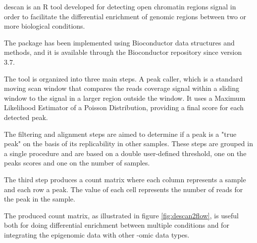 \gls{descan} is an R \cite{Ihaka1996} tool developed for detecting open chromatin regions signal in order to facilitate the differential enrichment of genomic regions between two or more biological conditions.

The package has been implemented using Bioconductor \cite{Gentleman2004} data structures and methods, and it is available through the Bioconductor repository since version 3.7.

The tool is organized into three main steps. 
A peak caller, which is a standard moving scan window that compares the reads coverage signal within a sliding window to the signal in a larger region outside the window. It uses a Maximum Likelihood Estimator of a Poisson Distribution, providing a final score for each detected peak.

The filtering and alignment steps are aimed to determine if a peak is a "true peak" on the basis of its replicability in other samples. 
These steps are grouped in a single procedure and are based on a double user-defined threshold, one on the peaks scores and one on the number of samples.

The third step produces a count matrix where each column represents a sample and each row a peak. The value of each cell represents the number of reads for the peak in the sample.

The produced count matrix, as illustrated in figure \ref{fig:descan2flow}, is useful both for doing differential enrichment between multiple conditions and for integrating the epigenomic data with other -omic data types.



